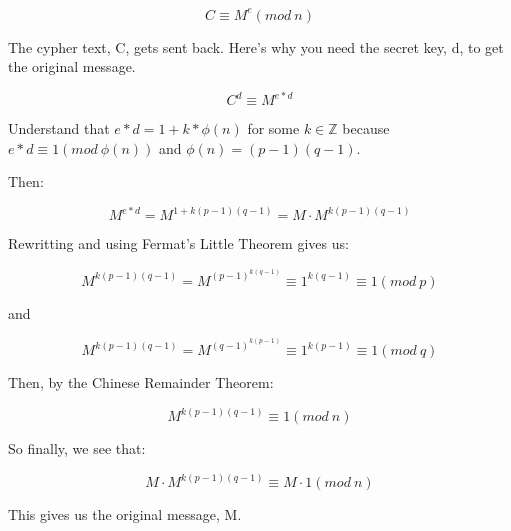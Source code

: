 \documentclass{article}
\begin{document}
$$
C \equiv M^e (mod\ n)
$$

The cypher text, C, gets sent back. Here's why you need the secret key, d, to get the original message.

$$
C^d \equiv M^{e*d}
$$

Understand that $e*d=1+k*\phi(n)$ for some $k \in \mathbb{Z}$ because $e*d \equiv 1 (mod\ \phi(n))$ and 
$\phi(n)=(p-1)(q-1)$. 

Then:

$$
M^{e*d} = M^{1+k(p-1)(q-1)}=M \cdot M^{k(p-1)(q-1)}
$$

Rewritting and using Fermat's Little Theorem gives us:

$$
M^{k(p-1)(q-1)} = M^{(p-1)^{k(q-1)}} \equiv 1^{k(q-1)} \equiv 1 (mod\ p)
$$

and

$$
M^{k(p-1)(q-1)} = M^{(q-1)^{k(p-1)}} \equiv 1^{k(p-1)} \equiv 1 (mod\ q)
$$

Then, by the Chinese Remainder Theorem:

$$
M^{k(p-1)(q-1)} \equiv 1 (mod\ n)
$$

So finally, we see that:

$$
M \cdot M^{k(p-1)(q-1)} \equiv M \cdot 1 (mod\ n)
$$

This gives us the original message, M.
\end{document}
